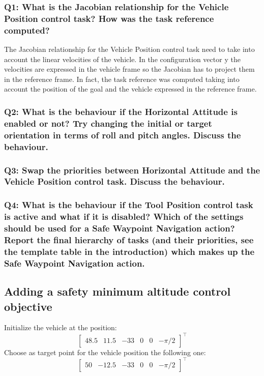 \documentclass{article}
\begin{document}
\subsubsection{Q1: What is the Jacobian relationship for the Vehicle Position control task? How was the task reference computed?}
The Jacobian relationship for the Vehicle Position control task need to take into account the linear velocities of the vehicle. In the configuration vector y the velocities are expressed in the vehicle frame so the Jacobian has to project them in the reference frame. In fact, the task reference was computed taking into account the position of the goal and the vehicle expressed in the reference frame.


\subsubsection{Q2: What is the behaviour if the Horizontal Attitude is enabled or not? Try changing the initial or target orientation in terms of roll and pitch angles. Discuss the behaviour.}


\subsubsection{Q3: Swap the priorities between Horizontal Attitude and the Vehicle Position control task. Discuss the behaviour.}

\subsubsection{Q4: What is the behaviour if the Tool Position control task is active and what if it is disabled? Which of the settings should be used for a Safe Waypoint Navigation action? Report the final hierarchy of tasks (and their priorities, see the template table in the introduction) which makes up the Safe Waypoint Navigation action.}


\subsection{Adding a safety minimum altitude control objective}
Initialize the vehicle at the position:
\begin{displaymath}
\begin{bmatrix} 48.5 & 11.5 & -33 & 0 & 0 &-\pi/2\end{bmatrix}^\top
\end{displaymath} 
Choose as target point for the vehicle position the following one:
\begin{displaymath}
\begin{bmatrix} 50 & -12.5 & -33 & 0 & 0 & -\pi/2 \end{bmatrix}^\top
\end{displaymath}
\end{document}
